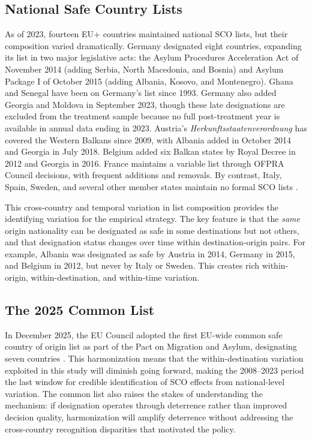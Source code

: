 \documentclass[12pt]{article}
\begin{document}
\subsection{National Safe Country Lists}

As of 2023, fourteen EU+ countries maintained national SCO lists, but their composition varied dramatically. Germany designated eight countries, expanding its list in two major legislative acts: the Asylum Procedures Acceleration Act of November 2014 (adding Serbia, North Macedonia, and Bosnia) and Asylum Package I of October 2015 (adding Albania, Kosovo, and Montenegro). Ghana and Senegal have been on Germany's list since 1993. Germany also added Georgia and Moldova in September 2023, though these late designations are excluded from the treatment sample because no full post-treatment year is available in annual data ending in 2023. Austria's \textit{Herkunftsstaatenverordnung} has covered the Western Balkans since 2009, with Albania added in October 2014 and Georgia in July 2018. Belgium added six Balkan states by Royal Decree in 2012 and Georgia in 2016. France maintains a variable list through OFPRA Council decisions, with frequent additions and removals. By contrast, Italy, Spain, Sweden, and several other member states maintain no formal SCO lists \citep{aida2023country}.

This cross-country and temporal variation in list composition provides the identifying variation for the empirical strategy. The key feature is that the \textit{same} origin nationality can be designated as safe in some destinations but not others, and that designation status changes over time within destination-origin pairs. For example, Albania was designated as safe by Austria in 2014, Germany in 2015, and Belgium in 2012, but never by Italy or Sweden. This creates rich within-origin, within-destination, and within-time variation.

\subsection{The 2025 Common List}

In December 2025, the EU Council adopted the first EU-wide common safe country of origin list as part of the Pact on Migration and Asylum, designating seven countries \citep{eucouncil2025pact}. This harmonization means that the within-destination variation exploited in this study will diminish going forward, making the 2008--2023 period the last window for credible identification of SCO effects from national-level variation. The common list also raises the stakes of understanding the mechanism: if designation operates through deterrence rather than improved decision quality, harmonization will amplify deterrence without addressing the cross-country recognition disparities that motivated the policy.
\end{document}
